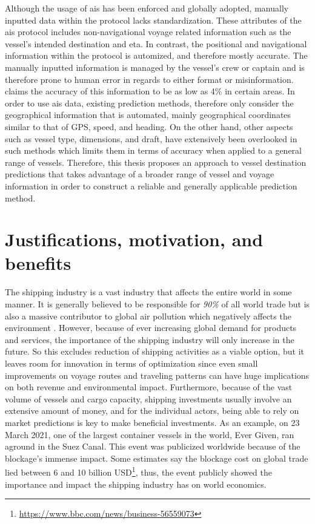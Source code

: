 Although the usage of \acrshort{ais} has been enforced and globally adopted, manually inputted data within the protocol lacks standardization. These attributes of the \acrshort{ais} protocol includes non-navigational \gls{voyage} related information such as the vessel's intended destination and \acrfull{eta}. In contrast, the positional and navigational information within the protocol is automized, and therefore mostly accurate. The manually inputted information is managed by the vessel's crew or captain and is therefore prone to human error in regards to either format or misinformation. \cite{mestl2016} claims the accuracy of this information to be as low as 4\% in certain areas. In order to use \acrshort{ais} data, existing prediction methods, therefore only consider the geographical information that is automated, mainly geographical coordinates similar to that of GPS\@, speed, and heading. On the other hand, other aspects such as vessel type, dimensions, and draft, have extensively been overlooked in such methods which limits them in terms of accuracy when applied to a general range of vessels. Therefore, this thesis proposes an approach to vessel destination predictions that takes advantage of a broader range of vessel and voyage information in order to construct a reliable and generally applicable prediction method.

\section{Justifications, motivation, and benefits}
\label{section:justifications_motivations_benefits}

The shipping industry is a vast industry that affects the entire world in some manner. It is generally believed to be responsible for \textit{90\%} of all world trade \parencite{grote2016} but is also a massive contributor to global air pollution which negatively affects the environment \parencite{zheng2016:online}. However, because of ever increasing global demand for products and services, the importance of the shipping industry will only increase in the future. So this excludes reduction of shipping activities as a viable option, but it leaves room for innovation in terms of optimization since even small improvements on voyage routes and traveling patterns can have huge implications on both revenue and environmental impact. Furthermore, because of the vast volume of vessels and cargo capacity, shipping investments usually involve an extensive amount of money, and for the individual actors, being able to rely on market predictions is key to make beneficial investments. As an example, on 23 March 2021, one of the largest container vessels in the world, Ever Given, ran aground in the Suez Canal. This event was publicized worldwide because of the blockage's immense impact. Some estimates say the blockage cost on global trade lied between 6 and 10 billion USD\footnote{\url{https://www.bbc.com/news/business-56559073}}, thus, the event publicly showed the importance and impact the shipping industry has on world economics.

